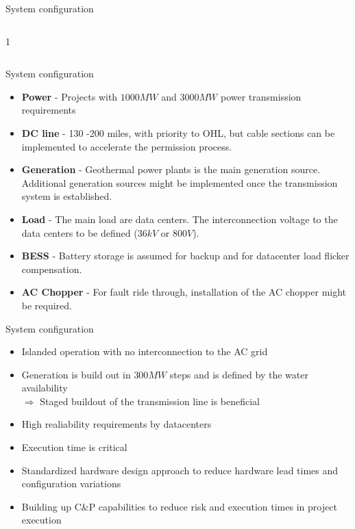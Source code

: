 

\begin{frame}{System configuration}
  \begin{columns}[c,onlytextwidth]
    \begin{column}{1\textwidth}
      \centering
    \end{column}
  \end{columns}
\end{frame}


\begin{frame}{System configuration}
  \begin{itemize}
    \setlength{\itemsep}{0.5em}
    \item \textbf{Power} - Projects with $1000MW$ and $3000MW$ power transmission requirements
    \item \textbf{DC line} - 130 -200 miles, with priority to OHL, but cable sections can be implemented to accelerate the permission process.
    \item \textbf{Generation} - Geothermal power plants is the main generation source. Additional generation sources might be implemented once the transmission system is established.
    \item \textbf{Load} - The main load are data centers. The interconnection voltage to the data centers to be defined ($36kV$ or $800V$).
    \item \textbf{BESS} - Battery storage is assumed for backup and for datacenter load flicker compensation.
    \item \textbf{AC Chopper} - For fault ride through, installation of the AC chopper might be required.
  \end{itemize}
\end{frame}


\begin{frame}{System configuration}
  \begin{itemize}
    \setlength{\itemsep}{0.5em}
    \item Islanded operation with no interconnection to the AC grid
    \item Generation is build out in $300MW$ steps and is defined by the water availability \\ $\Rightarrow$ Staged buildout of the transmission line is beneficial
    \item High realiability requirements by datacenters
    \item Execution time is critical
    \item Standardized hardware design approach to reduce hardware lead times and configuration variations
    \item Building up C\&P capabilities to reduce risk and execution times in project execution
  \end{itemize}
\end{frame}


